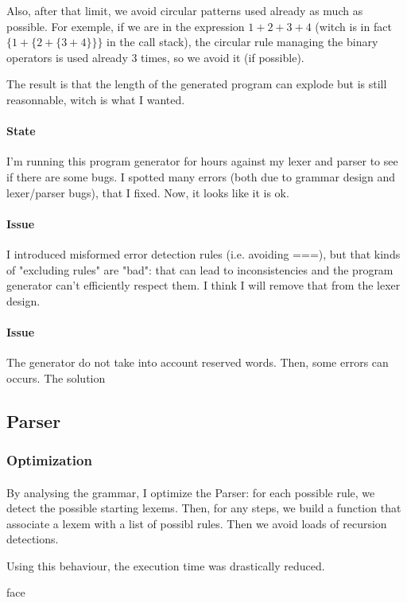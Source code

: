 \documentclass{article}
\begin{document}
			Also, after that limit, we avoid circular patterns used already as much as possible. For exemple, if we are in the expression $1 + 2 + 3 + 4$ (witch is in fact $\{1 + \{2 + \{3 + 4\}\}\}$ in the call stack), the circular rule managing the binary operators is used already 3 times, so we avoid it (if possible).

			The result is that the length of the generated program can explode but is still reasonnable, witch is what I wanted.

			\paragraph{State} I'm running this program generator for hours against my lexer and parser to see if there are some bugs. I spotted many errors (both due to grammar design and lexer/parser bugs), that I fixed. Now, it looks like it is ok.

			\paragraph{Issue} I introduced misformed error detection rules (i.e. avoiding ===), but that kinds of "excluding rules" are "bad": that can lead to inconsistencies and the program generator can't efficiently respect them. I think I will remove that from the lexer design.

			\paragraph{Issue} The generator do not take into account reserved words. Then, some errors can occurs. The solution 

		\subsection{Parser}
			\subsubsection{Optimization}
				\paragraph{} By analysing the grammar, I optimize the Parser: for each possible rule, we detect the possible starting lexems. Then, for any steps, we build a function that associate a lexem with a list of possibl rules. Then we avoid loads of recursion detections.

				Using this behaviour, the execution time was drastically reduced.

face
\end{document}
